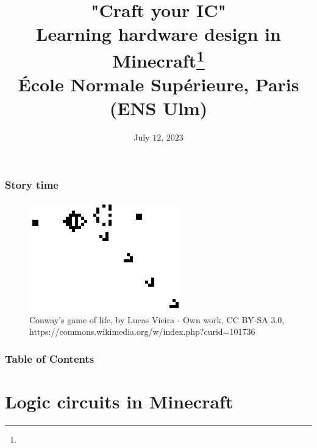 \documentclass[aspectratio=169]{beamer}
\title{"Craft your IC"\\Learning hardware design in
Minecraft\footnote{\tiny{}\reproduce}\\\small{} École Normale Supérieure, Paris (ENS Ulm)}
\author{\names}
\institute{FSiC $2023$}
\date{July $12$, $2023$}
\begin{document}
\beamertemplatenavigationsymbolsempty
{}

\maketitle

\begin{frame}[fragile]
	\frametitle{Story time}
	\begin{figure}
		\includegraphics[width=.5\textwidth]{imgs/game_of_life.png}
		\caption*{Conway's game of life, by Lucas Vieira - Own work, CC BY-SA 3.0, https://commons.wikimedia.org/w/index.php?curid=101736}
	\end{figure}

\end{frame}

\begin{frame}[fragile]
	\frametitle{Table of Contents}
	\tableofcontents
\end{frame}

\section{Logic circuits in Minecraft}

 {
  \begin{frame}[plain]
  \end{frame}
 }
\end{document}
